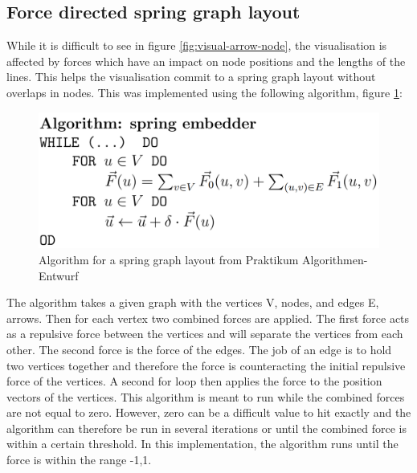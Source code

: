 \subsection{Force directed spring graph layout}
While it is difficult to see in figure \ref{fig:visual-arrow-node}, the visualisation is affected by forces which have an impact on node positions and the lengths of the lines. This helps the visualisation commit to a spring graph layout without overlaps in nodes. This was implemented using the following algorithm, figure \ref{fig:algo}:
\begin{figure}[H]
    \centering
    \includegraphics[width=1\linewidth]{figures/algo.pdf}
    \caption{Algorithm for a spring graph layout from Praktikum Algorithmen-Entwurf}
    \label{fig:algo}
\end{figure}
The algorithm takes a given graph with the vertices V, nodes, and edges E, arrows. Then for each vertex two combined forces are applied. The first force acts as a repulsive force between the vertices and will separate the vertices from each other. The second force is the force of the edges. The job of an edge is to hold two vertices together and therefore the force is counteracting the initial repulsive force of the vertices. A second for loop then applies the force to the position vectors of the vertices. This algorithm is meant to run while the combined forces are not equal to zero. However, zero can be a difficult value to hit exactly and the algorithm can therefore be run in several iterations or until the combined force is within a certain threshold. In this implementation, the algorithm runs until the force is within the range {-1,1}.

